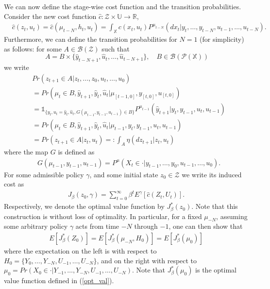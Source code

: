 \documentclass[11pt]{article}
\def\B{{\mathcal B}}
\def\P{{\mathcal P}}
\begin{document}
We can now define the stage-wise cost function and the transition probabilities. Consider the new cost function $\hat{c}:{\mathcal{Z}}\times \mathds{U}\to \mathds{R}$,  
\begin{align}\label{hat_cost}
&\hat{c}({z}_t,u_t)=\hat{c}(\mu_{t-N},h_t,u_t)=\int_\mathds{X}c(x_t,u_t)P^{\mu_{t-N}}(dx_t|y_t,\dots,y_{t-N},u_{t-1},\dots,u_{t-N}).\nonumber
\end{align}
Furthermore, we can define the transition probabilities for $N=1$ (for simplicity) as follows: for some $A\in \B(\mathcal{Z})$ such that 
\[\ A= B\times\{\hat{y}_{t-N+1},\hat{u}_{t},\dots,\hat{u}_{t-N+1}\},\quad  B\in\B(\P(\mathds{X})) \]
we write
\begin{align*}
&Pr({z}_{t+1}\in A|{z}_{t},\dots,{z}_0,u_{t},\dots,u_0) \\
&=Pr(\mu_t\in B,\hat{y}_{t+1},\hat{y}_{t},\hat{u}_{t}|\mu_{[t-1,0]},y_{[t,0]},u_{[t,0]})\\
&=\mathds{1}_{\{y_{t},u_{t}=\hat{y}_{t},\hat{u}_{t},G(\mu_{t-1},y_{t-1},u_{t-1})\in B\}} P^{\mu_{t-1}}(\hat{y}_{t+1}|y_t,y_{t-1},u_{t},u_{t-1})\\
&=Pr(\mu_{t}\in B,\hat{y}_{t+1},\hat{y}_{t},\hat{u}_{t}|\mu_{t-1},y_t,y_{t-1},u_t,u_{t-1})\\
&=Pr({z}_{t+1}\in A|{z}_t,u_t)=:\int_A{\eta}(d{z}_{t+1}|{z}_t,u_t)
\end{align*}
where the map $G$ is defined as 
\begin{align*}
&G(\mu_{t-1},y_{t-1},u_{t-1})=P^\mu(X_{t}\in\cdot|y_{t-1},\dots,y_0,u_{t-1},\dots,u_0).
\end{align*}
For some admissible policy $\gamma$, and some initial state $z_0\in\mathcal{Z}$ we write its induced cost as 
\begin{align*}
{J}_\beta(z_0,\gamma) = \sum_{t=0}^\infty \beta^t E^\gamma[\hat{c}(Z_t,U_t)].
\end{align*}
Respectively, we denote the optimal value function by ${J}^*_\beta(z_0)$. Note that this construction is without loss of optimality. In particular, for a fixed $\mu_{-N}$, assuming some arbitrary policy $\gamma$ acts from time $-N$ through $-1$, one can then show that 
\begin{align*}
E\left[ {J}_\beta^*(Z_0)\right] = E\left[ {J}_\beta^*(\mu_{-N} , H_0)\right] = E[J_\beta^*(\mu_0)]
\end{align*}
where the expectation on the left is with respect to $H_0=\{Y_0,\dots,Y_{-N},U_{-1},\dots, U_{-N} \}$, and on the right with respect to $\mu_{0}=Pr(X_{0}\in \cdot|Y_{-1},\dots,Y_{-N},U_{-1},\dots,U_{-N})$. Note that $J_\beta^*(\mu_0)$ is the optimal value function defined in (\ref{opt_val}). 
\end{document}
